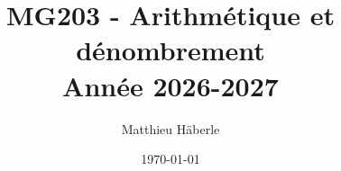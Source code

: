 \documentclass[a4paper, 12pt]{report}
\title{
	{\Huge MG203 - Arithmétique et dénombrement \\ }
	{\huge Année 2026-2027}
}
\author{\Large{Matthieu Häberle}}
\date{\today}
\begin{document}
\maketitle
\newpage
\twocolstableofcontents
\pagebreak








\end{document}
